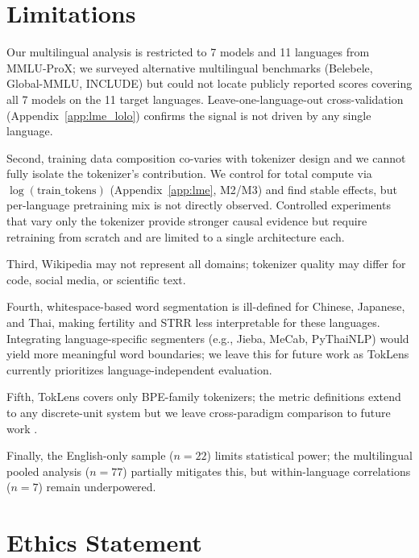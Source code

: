 \documentclass[11pt]{article}
\begin{document}
\section*{Limitations}

Our multilingual analysis is restricted to 7 models and 11 languages from MMLU-ProX; we surveyed alternative multilingual benchmarks (Belebele, Global-MMLU, INCLUDE) but could not locate publicly reported scores covering all 7 models on the 11 target languages. Leave-one-language-out cross-validation (Appendix~\ref{app:lme_lolo}) confirms the signal is not driven by any single language.

Second, training data composition co-varies with tokenizer design and we cannot fully isolate the tokenizer's contribution. We control for total compute via $\log(\text{train\_tokens})$ (Appendix~\ref{app:lme}, M2/M3) and find stable effects, but per-language pretraining mix is not directly observed. Controlled experiments that vary only the tokenizer \citep{ali2024tokenizer, altintas2025toksuite} provide stronger causal evidence but require retraining from scratch and are limited to a single architecture each.

Third, Wikipedia may not represent all domains; tokenizer quality may differ for code, social media, or scientific text.

Fourth, whitespace-based word segmentation is ill-defined for Chinese, Japanese, and Thai, making fertility and STRR less interpretable for these languages. Integrating language-specific segmenters (e.g., Jieba, MeCab, PyThaiNLP) would yield more meaningful word boundaries; we leave this for future work as TokLens currently prioritizes language-independent evaluation.

Fifth, TokLens covers only BPE-family tokenizers; the metric definitions extend to any discrete-unit system but we leave cross-paradigm comparison to future work \citep{clark-etal-2022-canine, xue2022byt5}.

Finally, the English-only sample ($n=22$) limits statistical power; the multilingual pooled analysis ($n=77$) partially mitigates this, but within-language correlations ($n=7$) remain underpowered.

\section*{Ethics Statement}
\end{document}
